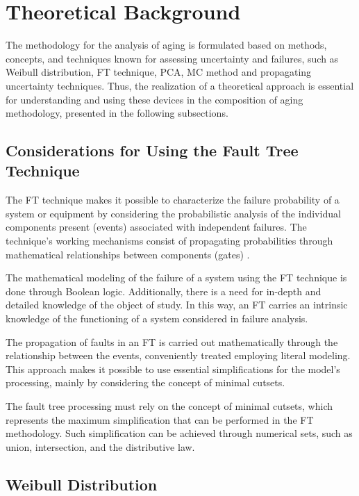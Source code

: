 \documentclass{ws-m3as}
\begin{document}
\section{Theoretical Background}

The methodology for the analysis of aging is formulated based on methods, concepts, and techniques known for assessing uncertainty and failures, such as Weibull distribution, FT technique, PCA, MC method and propagating uncertainty techniques. Thus, the realization of a theoretical approach is essential for understanding and using these devices in the composition of aging methodology, presented in the following subsections.


\subsection{Considerations for Using the Fault Tree Technique}

The FT technique makes it possible to characterize the failure probability of a system or equipment by considering the probabilistic analysis of the individual components present (events) associated with independent failures. The technique's working mechanisms consist of propagating probabilities through mathematical relationships between components (gates) \cite{Borges2015}.

The mathematical modeling of the failure of a system using the FT technique is done through Boolean logic. Additionally, there is a need for in-depth and detailed knowledge of the object of study. In this way, an FT carries an intrinsic knowledge of the functioning of a system  considered in failure analysis.

The propagation of faults in an FT is carried out mathematically through the relationship between the events, conveniently treated employing literal modeling. This approach makes it possible to use essential simplifications for the model's processing, mainly by considering the concept of minimal cutsets.

The fault tree processing must rely on the concept of minimal cutsets, which represents the maximum simplification that can be performed in the FT methodology. Such simplification can be achieved through numerical sets, such as union, intersection, and the distributive law.

\subsection{Weibull Distribution}
\end{document}
